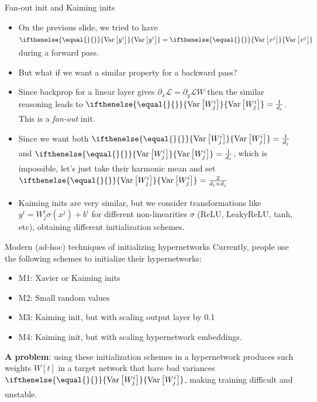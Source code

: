 \documentclass[handout, 10pt]{beamer}
\newcommand{\var}[2][]{
\ifthenelse{\equal{#1}{}}{
\text{Var}\left[#2\right]
}{
\underset{#1}{\text{Var}}\left[#2\right]
}}
\begin{document}
\begin{frame}{Fan-out init and Kaiming inits}
    \begin{itemize}
        \item\pause On the previous slide, we tried to have $\var{y^i} = \var{x^j}$ during a forward pass.
        \item\pause But what if we want a similar property for a backward pass?
        \item\pause Since backprop for a linear layer gives $\partial_x \mathcal{L} = \partial_y \mathcal{L} W$
        then the similar reasoning leads to $\var{W_j^i} = \frac{1}{d_i}$. This is a \textit{fan-out} init.
        \item\pause Since we want both $\var{W_j^i} = \frac{1}{d_j}$ and $\var{W_j^i} = \frac{1}{d_i}$, which is impossible, let's just take their harmonic mean and set $\var{W_j^i} = \frac{2}{d_i + d_j}$
        \item\pause Kaiming inits are very similar, but we consider transformations like $y^i = W_j^i \sigma(x^j) + b^i$ for different non-linearities $\sigma$ (ReLU, LeakyReLU, tanh, etc), obtaining different initialization schemes.
    \end{itemize}
\end{frame}

\begin{frame}{Modern (ad-hoc) techniques of initializing hypernetworks}
    \pause Currently, people use the following schemes to initialize their hypernetworks:
    \begin{itemize}
        \item M1: Xavier or Kaiming inits
        \item M2: Small random values
        \item M3: Kaiming init, but with scaling output layer by 0.1
        \item M4: Kaiming init, but with scaling hypernetwork embeddings.
    \end{itemize}
    
    \pause
    \textbf{A problem}: using these initialization schemes in a hypernetwork produces such weights $W[t]$ in a target network that have bad variances $\var{W^i_j}$, making training difficult and unstable.
\end{frame}
\end{document}
